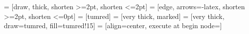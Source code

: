 \usepackage{tikz}
\usepackage{pgfplots}
\pgfplotsset{compat=1.12}

\usetikzlibrary{calc}
\usetikzlibrary{shapes.multipart}
\usetikzlibrary{positioning}

 = [draw, thick, shorten >=2pt, shorten <=2pt]
 = [edge, arrows={-latex}, shorten >=2pt, shorten <=0pt]
 = [tumred]
 = [very thick, marked]
 = [very thick, draw=tumred, fill=tumred!15]
 = [align=center, execute at begin node=\setlength{\baselineskip}{2ex}]
